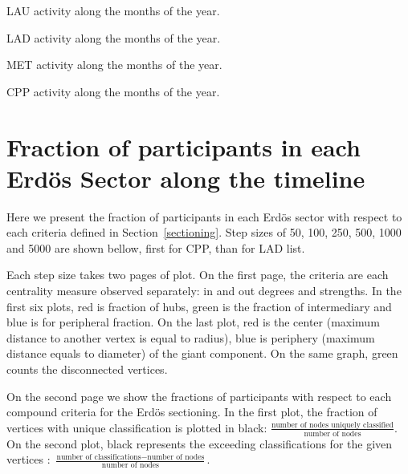 \documentclass[%
 aip,
 jmp,%
 amsmath,amssymb,
 reprint,%
 floatfix,
]{revtex4-1}
\begin{document}
\begin{table}[!h]
	\caption{LAU activity along the months of the year.}
	\footnotesize
	
\label{tab:min2}
\end{table}
\begin{table}[!h]
	\caption{LAD activity along the months of the year.}
	\footnotesize
	
\label{tab:min2}
\end{table}
\begin{table}[!h]
	\caption{MET activity along the months of the year.}
	\footnotesize
	
\label{tab:min2}
\end{table}

\begin{table}[!h]
	\caption{CPP activity along the months of the year.}
	\footnotesize
	
\label{tab:min2}
\end{table}



\section{Fraction of participants in each Erd\"os Sector along the timeline}\label{sec:frac}
Here we present the fraction of participants in each Erd\"os sector with respect to each criteria defined in Section~\ref{sectioning}. Step sizes of 50, 100, 250, 500, 1000 and 5000 are shown bellow, first for CPP, than for  LAD list.

Each step size takes two pages of plot. On the first page, the criteria are each centrality measure observed separately: in and out degrees and strengths. In the first six plots, red is fraction of hubs, green is the fraction of intermediary and blue is for peripheral fraction. On the last plot, red is the center (maximum distance to another vertex is equal to radius), blue is periphery (maximum distance equals to diameter) of the giant component. On the same graph, green counts the disconnected vertices.

On the second page we show the fractions of participants with respect to each compound criteria for the Erd\"os sectioning. In the first plot, the fraction of vertices with unique classification is plotted in black: $\frac{\text{number of nodes uniquely classified}}{\text{number of nodes}}$. On the second plot, black represents the exceeding classifications for the given vertices : $\frac{\text{number of classifications} - \text{number of nodes}}{\text{number of nodes}}$.
\end{document}
